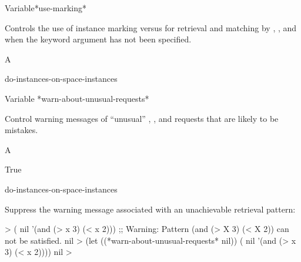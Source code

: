 \documentclass[10pt,twoside,english,pdftex]{article}
\begin{document}
\begin{functiondoc}{Variable}{*use-marking*}{}%

\fnsyntax

\fnpurpose Controls the use of instance marking versus  for
retrieval and matching by
,
, and
 when the keyword
argument  has not been specified.

\fnpackage {}

\fnmodule {}

\fnvaluetype A 

\fninitialvalue {}

\begin{alsos}{do-instances-on-space-instances}
\end{alsos}

\end{functiondoc}


\begin{functiondoc}{Variable}%
{*warn-about-unusual-requests*}{}%

\fnsyntax

\fnpurpose Control warning messages of ``unusual''
,
, and
 requests that are
likely to be mistakes.

\fnpackage {}

\fnmodule {}

\fnvaluetype A 

\fninitialvalue True

\begin{alsos}{do-instances-on-space-instances}
\end{alsos}

\fnexample
Suppress the warning message associated with an unachievable retrieval pattern:
%
\W\supp
\begin{example}
  > ( nil '(and (> x 3) (< x 2)))
  ;; Warning: Pattern (and (> X 3) (< X 2)) can not be satisfied.
  nil
  > (let ((*warn-about-unusual-requests* nil))
      ( nil '(and (> x 3) (< x 2))))
  nil
  >
\end{example}

\end{functiondoc}
\end{document}
